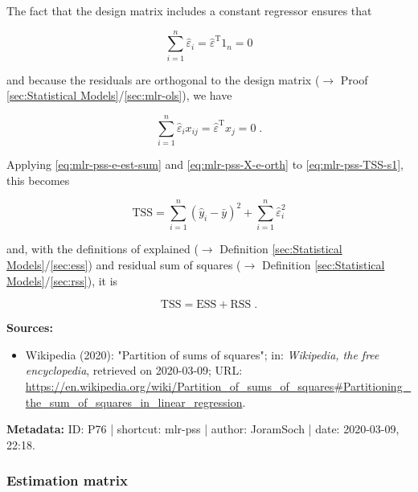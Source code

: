 \documentclass[a4paper,12pt,twoside]{book}
\begin{document}
The fact that the design matrix includes a constant regressor ensures that

\begin{equation} \label{eq:mlr-pss-e-est-sum}
\sum_{i=1}^{n} \hat{\varepsilon}_i = \hat{\varepsilon}^\mathrm{T} 1_n = 0
\end{equation}

and because the residuals are orthogonal to the design matrix ($\rightarrow$ Proof \ref{sec:Statistical Models}/\ref{sec:mlr-ols}), we have

\begin{equation} \label{eq:mlr-pss-X-e-orth}
\sum_{i=1}^{n} \hat{\varepsilon}_i x_{ij} = \hat{\varepsilon}^\mathrm{T} x_j = 0 \; .
\end{equation}

Applying \eqref{eq:mlr-pss-e-est-sum} and \eqref{eq:mlr-pss-X-e-orth} to \eqref{eq:mlr-pss-TSS-s1}, this becomes

\begin{equation} \label{eq:mlr-pss-TSS-s2}
\mathrm{TSS} = \sum_{i=1}^{n} (\hat{y}_i - \bar{y})^2 + \sum_{i=1}^{n} \hat{\varepsilon}_i^2
\end{equation}

and, with the definitions of explained ($\rightarrow$ Definition \ref{sec:Statistical Models}/\ref{sec:ess}) and residual sum of squares ($\rightarrow$ Definition \ref{sec:Statistical Models}/\ref{sec:rss}), it is

\begin{equation} \label{eq:mlr-pss-TSS-s3}
\mathrm{TSS} = \mathrm{ESS} + \mathrm{RSS} \; .
\end{equation}


\vspace{1em}
\textbf{Sources:}
\begin{itemize}
\item Wikipedia (2020): "Partition of sums of squares"; in: \textit{Wikipedia, the free encyclopedia}, retrieved on 2020-03-09; URL: \url{https://en.wikipedia.org/wiki/Partition_of_sums_of_squares#Partitioning_the_sum_of_squares_in_linear_regression}.
\end{itemize}


\vspace{1em}
\textbf{Metadata:} ID: P76 | shortcut: mlr-pss | author: JoramSoch | date: 2020-03-09, 22:18.
\vspace{1em}



\subsubsection[\textit{Estimation matrix}]{Estimation matrix} \label{sec:emat}
\setcounter{equation}{0}
\end{document}
